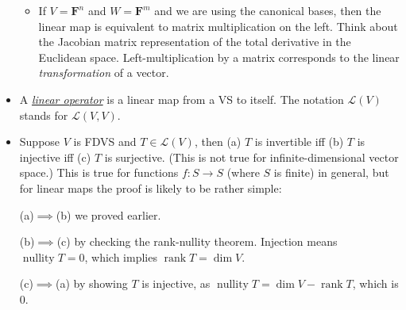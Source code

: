 \documentclass{article}
\newcommand{\df}[1]{\ul{\textit{#1}}}
\newcommand{\F}{\mathbf{F}}
\renewcommand{\d}{\dim}
\newcommand{\LV}{\mathcal{L}(V)}
\begin{document}
\begin{itemize}
\begin{itemize}
        \item If $V = \F^n$ and $W = \F^m$ and we are using the canonical bases, then the linear map is equivalent to matrix multiplication on the left. Think about the Jacobian matrix representation of the total derivative in the Euclidean space. Left-multiplication by a matrix corresponds to the linear \emph{transformation} of a vector.
    \end{itemize}
    \item A \df{linear operator} is a linear map from a VS to itself. The notation $\LV$ stands for $\mathcal{L}(V,V)$.
    \item Suppose $V$ is FDVS and $T \in \LV$, then (a) $T$ is invertible iff (b) $T$ is injective iff (c) $T$ is surjective. (This is not true for infinite-dimensional vector space.) This is true for functions $f:S \to S$ (where $S$ is finite) in general, but for linear maps the proof is likely to be rather simple:
        
    (a)$\implies$(b) we proved earlier.
        
    (b)$\implies$(c) by checking the rank-nullity theorem. Injection means $\operatorname{nullity} T = 0$, which implies $\operatorname{rank} T = \d V$.
        
    (c)$\implies$(a) by showing $T$ is injective, as $\operatorname{nullity} T = \d V - \operatorname{rank} T$, which is 0.
\end{itemize}
\end{document}
